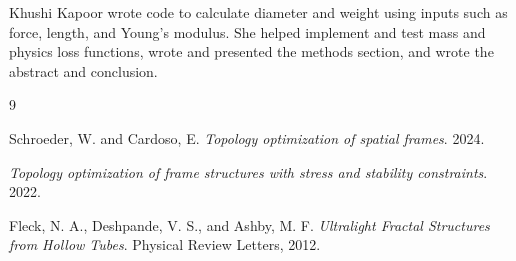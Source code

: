 \documentclass[11pt]{article}
\begin{document}
Khushi Kapoor wrote code to calculate diameter and weight using inputs such as force, length, and Young's modulus. She helped implement and test mass and physics loss functions, wrote and presented the methods section, and wrote the abstract and conclusion.

\begin{thebibliography}{9}

Schroeder, W. and Cardoso, E. \emph{Topology optimization of spatial frames}. 2024.

\emph{Topology optimization of frame structures with stress and stability constraints}. 2022.

Fleck, N. A., Deshpande, V. S., and Ashby, M. F. \emph{Ultralight Fractal Structures from Hollow Tubes}. Physical Review Letters, 2012.

\end{thebibliography}
\end{document}
